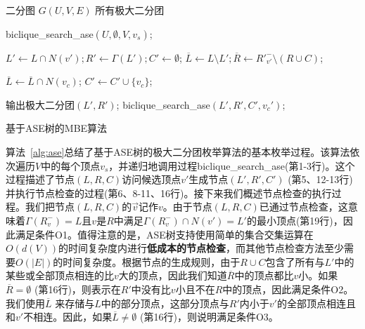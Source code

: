 \begin{algorithm}[H]
  \begin{algorithmic}[1]
      \normalsize
      \REQUIRE 二分图 $G(U,V,E)$
      \ENSURE 所有极大二分团
      
      \renewcommand{\algorithmicdo}{\textbf{do}}
        \STATE \textsf{biclique\_search\_ase}$(U,\emptyset,V,v_s)$;
      \ENDFOR

      \renewcommand{\algorithmicwhile}{\textbf{procedure}}
      \renewcommand{\algorithmicdo}{\textbf{:}}
      \renewcommand{\algorithmicdo}{\textbf{do}}
      \STATE $L' \leftarrow L \cap N(v'); R' \leftarrow \Gamma(L'); C' \leftarrow \emptyset$;
      \STATE $\overline{L}\leftarrow L \setminus L'; \overline{R}\leftarrow {R'}_{v'}^- \setminus (R \cup C)$;

              \STATE $\overline{L} \leftarrow \overline{L} \cap N(v_c)$; 
            \ENDIF
            \STATE $C' \leftarrow C' \cup \{v_c\}$;
          \ENDIF
        \ENDFOR

          \STATE 输出极大二分团$(L', R')$;
              \STATE \textsf{biclique\_search\_ase}$(L', R', C', v_c')$;
            \ENDIF
          \ENDFOR
        \ENDIF
      \ENDWHILE

  \end{algorithmic}
  \caption{基于ASE树的MBE算法}
  \label{alg:ase}
\end{algorithm}


算法~\ref{alg:ase}总结了基于ASE树的极大二分团枚举算法的基本枚举过程。该算法依次遍历$V$中的每个顶点$v_s$，并递归地调用过程\textsf{biclique\_search\_ase}(第1-3行)。这个过程描述了节点$(L,R,C)$访问候选顶点$v'$生成节点$(L',R',C')$ (第5、12-13行)并执行节点检查的过程(第6、8-11、16行)。接下来我们概述节点检查的执行过程。我们把节点$(L,R,C)$的$\vec{v}$记作$v$。由于节点$(L,R,C)$已通过节点检查，这意味着$\Gamma(R_v^-) = L$且$v$是$R$中满足$\Gamma(R_v^-) \cap N(v') = L'$的最小顶点(第19行)，因此满足条件O1。值得注意的是，ASE树支持使用简单的集合交集运算在$O(d(V))$的时间复杂度内进行\textbf{低成本的节点检查}，而其他节点检查方法至少需要$O(|E|)$的时间复杂度。根据节点的生成规则，由于$R \cup C$包含了所有与$L'$中的某些或全部顶点相连的比$v$大的顶点，因此我们知道$\overline{R}$中的顶点都比$v$小。如果$\overline{R} = \emptyset$ (第16行)，则表示在$R'$中没有比$v$小且不在$R$中的顶点，因此满足条件O2。我们使用$\overline{L}$ 来存储与$L$中的部分顶点，这部分顶点与$R'$内小于$v'$的全部顶点相连且和$v'$不相连。因此，如果$\overline{L} \neq \emptyset$ (第16行)，则说明满足条件O3。

